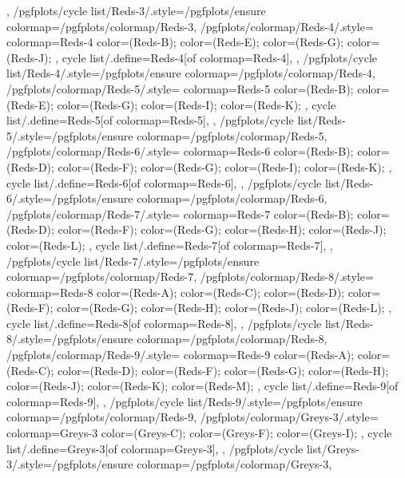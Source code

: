 {{  },
  /pgfplots/cycle list/Reds-3/.style={/pgfplots/ensure colormap={/pgfplots/colormap/Reds-3}},
  /pgfplots/colormap/Reds-4/.style={
    colormap={Reds-4}{
      color=(Reds-B);
      color=(Reds-E);
      color=(Reds-G);
      color=(Reds-J);
    },
    cycle list/.define={Reds-4}{[of colormap=Reds-4]},
  },
  /pgfplots/cycle list/Reds-4/.style={/pgfplots/ensure colormap={/pgfplots/colormap/Reds-4}},
  /pgfplots/colormap/Reds-5/.style={
    colormap={Reds-5}{
      color=(Reds-B);
      color=(Reds-E);
      color=(Reds-G);
      color=(Reds-I);
      color=(Reds-K);
    },
    cycle list/.define={Reds-5}{[of colormap=Reds-5]},
  },
  /pgfplots/cycle list/Reds-5/.style={/pgfplots/ensure colormap={/pgfplots/colormap/Reds-5}},
  /pgfplots/colormap/Reds-6/.style={
    colormap={Reds-6}{
      color=(Reds-B);
      color=(Reds-D);
      color=(Reds-F);
      color=(Reds-G);
      color=(Reds-I);
      color=(Reds-K);
    },
    cycle list/.define={Reds-6}{[of colormap=Reds-6]},
  },
  /pgfplots/cycle list/Reds-6/.style={/pgfplots/ensure colormap={/pgfplots/colormap/Reds-6}},
  /pgfplots/colormap/Reds-7/.style={
    colormap={Reds-7}{
      color=(Reds-B);
      color=(Reds-D);
      color=(Reds-F);
      color=(Reds-G);
      color=(Reds-H);
      color=(Reds-J);
      color=(Reds-L);
    },
    cycle list/.define={Reds-7}{[of colormap=Reds-7]},
  },
  /pgfplots/cycle list/Reds-7/.style={/pgfplots/ensure colormap={/pgfplots/colormap/Reds-7}},
  /pgfplots/colormap/Reds-8/.style={
    colormap={Reds-8}{
      color=(Reds-A);
      color=(Reds-C);
      color=(Reds-D);
      color=(Reds-F);
      color=(Reds-G);
      color=(Reds-H);
      color=(Reds-J);
      color=(Reds-L);
    },
    cycle list/.define={Reds-8}{[of colormap=Reds-8]},
  },
  /pgfplots/cycle list/Reds-8/.style={/pgfplots/ensure colormap={/pgfplots/colormap/Reds-8}},
  /pgfplots/colormap/Reds-9/.style={
    colormap={Reds-9}{
      color=(Reds-A);
      color=(Reds-C);
      color=(Reds-D);
      color=(Reds-F);
      color=(Reds-G);
      color=(Reds-H);
      color=(Reds-J);
      color=(Reds-K);
      color=(Reds-M);
    },
    cycle list/.define={Reds-9}{[of colormap=Reds-9]},
  },
  /pgfplots/cycle list/Reds-9/.style={/pgfplots/ensure colormap={/pgfplots/colormap/Reds-9}},
  /pgfplots/colormap/Greys-3/.style={
    colormap={Greys-3}{
      color=(Greys-C);
      color=(Greys-F);
      color=(Greys-I);
    },
    cycle list/.define={Greys-3}{[of colormap=Greys-3]},
  },
  /pgfplots/cycle list/Greys-3/.style={/pgfplots/ensure colormap={/pgfplots/colormap/Greys-3}},
}
